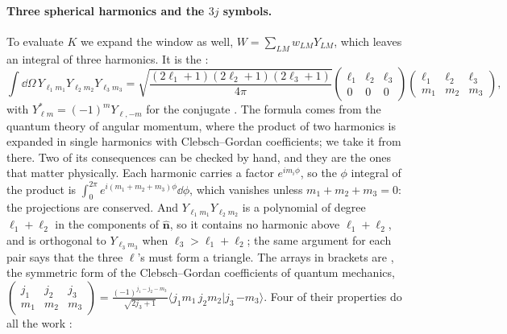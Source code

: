\paragraph{Three spherical harmonics and the $3j$ symbols.}
To evaluate $K$ we expand the window as well, $W=\sum_{LM}w_{LM}Y_{LM}$, which leaves an
integral of three harmonics. It is the :
\begin{equation}
  \int\dd\Omega\,Y_{\ell_1m_1}Y_{\ell_2m_2}Y_{\ell_3m_3}
  =\sqrt{\frac{(2\ell_1+1)(2\ell_2+1)(2\ell_3+1)}{4\pi}}
   \begin{pmatrix}\ell_1&\ell_2&\ell_3\\0&0&0\end{pmatrix}
   \begin{pmatrix}\ell_1&\ell_2&\ell_3\\m_1&m_2&m_3\end{pmatrix},
  \label{8b:eq:gaunt}
\end{equation}
with $Y^*_{\ell m}=(-1)^mY_{\ell,-m}$ for the conjugate . The formula comes from the
quantum theory of angular momentum, where the product of two harmonics is expanded in single
harmonics with Clebsch--Gordan coefficients; we take it from there. Two of its consequences can be
checked by hand, and they are the ones that matter physically. Each harmonic carries a factor
$e^{im_i\phi}$, so the $\phi$ integral of the product is $\int_0^{2\pi}e^{i(m_1+m_2+m_3)\phi}\dd\phi$, which vanishes
unless $m_1+m_2+m_3=0$: the projections are conserved. And $Y_{\ell_1m_1}Y_{\ell_2m_2}$ is a polynomial of
degree $\ell_1+\ell_2$ in the components of $\hat{\bm n}$, so it contains no harmonic above $\ell_1+\ell_2$, and is
orthogonal to $Y_{\ell_3m_3}$ when $\ell_3>\ell_1+\ell_2$; the same argument for each pair says that the three $\ell$'s must form a triangle. The arrays in brackets are
 , the symmetric form of the
Clebsch--Gordan coefficients of quantum mechanics,
$\begin{pmatrix}j_1&j_2&j_3\\m_1&m_2&m_3\end{pmatrix}=\frac{(-1)^{j_1-j_2-m_3}}{\sqrt{2j_3+1}}\langle j_1m_1\,j_2m_2|j_3\,{-m_3}\rangle$.
Four of their properties do all the work :
